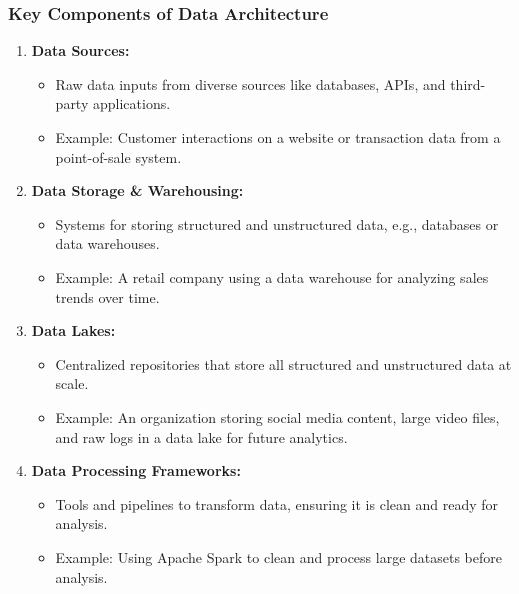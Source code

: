 \documentclass[aspectratio=169]{beamer}
\begin{document}
\begin{frame}[fragile]
    \frametitle{Key Components of Data Architecture}
    \begin{enumerate}
        \item \textbf{Data Sources:}
        \begin{itemize}
            \item Raw data inputs from diverse sources like databases, APIs, and third-party applications.
            \item Example: Customer interactions on a website or transaction data from a point-of-sale system.
        \end{itemize}

        \item \textbf{Data Storage \& Warehousing:}
        \begin{itemize}
            \item Systems for storing structured and unstructured data, e.g., databases or data warehouses.
            \item Example: A retail company using a data warehouse for analyzing sales trends over time.
        \end{itemize}

        \item \textbf{Data Lakes:}
        \begin{itemize}
            \item Centralized repositories that store all structured and unstructured data at scale.
            \item Example: An organization storing social media content, large video files, and raw logs in a data lake for future analytics.
        \end{itemize}

        \item \textbf{Data Processing Frameworks:}
        \begin{itemize}
            \item Tools and pipelines to transform data, ensuring it is clean and ready for analysis.
            \item Example: Using Apache Spark to clean and process large datasets before analysis.
        \end{itemize}
    \end{enumerate}
\end{frame}
\end{document}
